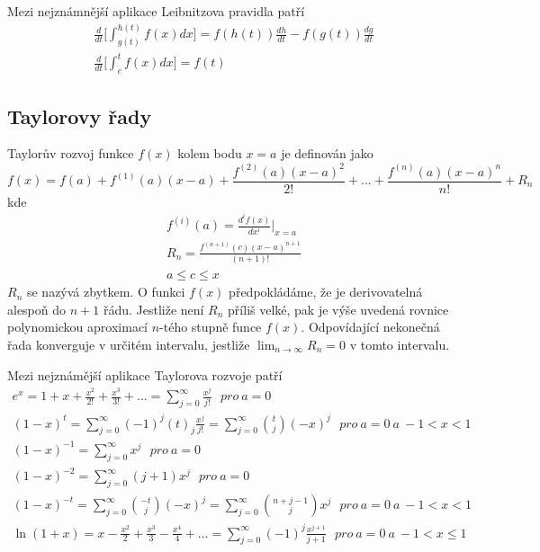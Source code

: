 \begin{theorem}
Mezi nejznámnější aplikace Leibnitzova pravidla patří
\begin{gather*}
\frac{d}{dt}\Big[\int_{g(t)}^{h(t)}f(x)dx \Big] = f(h(t)) \frac{dh}{dt} - f(g(t)) \frac{dg}{dt}\\
\frac{d}{dt}\Big[\int_c^t f(x)dx \Big] = f(t)
\end{gather*}
\end{theorem}

\subsection{Taylorovy řady}

\begin{definition}
Taylorův rozvoj funkce $f(x)$ kolem bodu $x = a$ je definován jako
\begin{equation*}
f(x) = f(a) + f^{(1)}(a)(x-a) + \frac{f^{(2)}(a)(x-a)^2}{2!} + ... + \frac{f^{(n)}(a)(x - a)^n}{n!} + R_n
\end{equation*}
kde
\begin{gather*}
f^{(i)}(a) = \frac{d^i f(x)}{d x^i}\Big|_{x = a}\\
R_n = \frac{f^{(n + 1)}(c)(x - a)^{n + 1}}{(n + 1)!}\\
a \le c \le x
\end{gather*}
$R_n$ se nazývá zbytkem. O funkci $f(x)$ předpokládáme, že je derivovatelná alespoň do $n + 1$ řádu. Jestliže není $R_n$ příliš velké, pak je výše uvedená rovnice polynomickou aproximací $n$-tého stupně funce $f(x)$. Odpovídající nekonečná řada konverguje v určitém intervalu, jestliže $\lim_{n \rightarrow \infty} R_n = 0$ v tomto intervalu.
\end{definition}

\begin{theorem}
Mezi nejznámější aplikace Taylorova rozvoje patří
\begin{gather*}
e^x = 1 + x + \frac{x^2}{2!} + \frac{x^3}{3!} + ... = \sum_{j = 0}^\infty \frac{x^j}{j!} ~~~\textit{pro}~ a = 0\\
(1 - x)^t = \sum_{j = 0}^{\infty}(-1)^j(t)_j \frac{x^j}{j!} = \sum_{j = 0}^{\infty}\binom{t}{j}(-x)^j ~~~\textit{pro}~ a = 0 ~\textit{a}~ -1 < x < 1\\
(1 - x)^{-1} = \sum_{j = 0}^{\infty} x^j  ~~~\textit{pro}~ a = 0\\
(1 - x)^{-2} = \sum_{j = 0}^{\infty}(j + 1)x^j  ~~~\textit{pro}~ a = 0\\
(1 - x)^{-t} = \sum_{j = 0}^{\infty}\binom{-t}{j}(-x)^j = \sum_{j = 0}^{\infty}\binom{n + j - 1}{j}x^j ~~~\textit{pro}~ a = 0 ~\textit{a}~ -1 < x < 1\\
\ln(1 + x) = x - \frac{x^2}{2} + \frac{x^3}{3} - \frac{x^4}{4} + ... = \sum_{j = 0}^{\infty} (-1)^{j}\frac{x^{j + 1}}{j + 1} ~~~\textit{pro}~ a = 0 ~\textit{a}~ -1 < x \le 1
\end{gather*}
\end{theorem}


